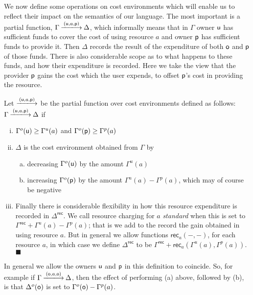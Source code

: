\documentclass{LMCS}
\newcommand{\cancom}[3]{({\ownfnt{#1}},{#2},{\ownfnt{#3}}) \xspace}
\newcommand{\record}{{\scriptstyle \mathsf{rec}}}
\newcommand{\ar}[1]{\mathbin{\xlongrightarrow{ #1}}}
\newcommand{\EndDefBox}{\null\hfill$\blacksquare$}
\newcommand{\boxHere}{\global\let\EndProof\empty\EndDefBox}
\begin{document}
We now define some operations on cost environments which will enable
us to reflect their impact on the semantics of our language. The most
important is a partial function, $\Gamma \ar{\cancom{u}{a}{p}}
\Delta$, which informally means that in $\Gamma$ owner ${\mathsf{u}}$ has
sufficient funds to cover the cost of using resource $a$ and owner
${\mathsf{p}}$ has sufficient funds to provide it.  Then $\Delta$ records
the result of the expenditure of both ${\mathsf{o}}$ and ${\mathsf{p}}$ of
those funds. There is also considerable scope as to what happens to
these funds, and how their expenditure is recorded.  Here we take the
view that the provider ${\mathsf{p}}$ gains the cost which the user
expends, to offset  ${\mathsf{p}}$'s cost in providing the resource.
\begin{defi}\label{def:rescharging}
  Let $\ar{\cancom{u}{a}{p}}$ be the partial function 
over cost environments defined as follows:
$\Gamma \ar{\cancom{u}{a}{p}} \Delta$ if
\begin{enumerate}[(i)]



\item $\Gamma^o({{\mathsf{u}}}) \geq \Gamma^u(a)$ and 
$\Gamma^o({{\mathsf{p}}}) \geq \Gamma^p(a)$

\item $\Delta$  is the cost environment obtained from $\Gamma$ by 
  \begin{enumerate}[(a)]
  \item decreasing $\Gamma^o({{\mathsf{u}}})$ by the amount  $\Gamma^u(a)$

  \item increasing  $\Gamma^o({{\mathsf{p}}})$ by the 
amount $\Gamma^u(a) - \Gamma^p(a)$, which may of course be negative


  \end{enumerate}

\item 
  Finally there is considerable flexibility in how this resource
  expenditure is recorded in $\Delta^{\record}$.  We call resource 
  charging  for $a$  \emph{standard} when this is set to $\Gamma^{\record} 
  + \Gamma^u(a) -  \Gamma^p(a)$; that is we add to the record the gain
  obtained in using resource $a$.  But in general we allow functions
  $\record_a(-,-)$, for each resource $a$, in which case we define
  $\Delta^{\record}$ to be $\Gamma^{\record} + \record_a(\Gamma^u(a),\Gamma^p(a))$. \boxHere
\end{enumerate}
\end{defi}
\noindent
In general we allow the owners ${\mathsf{u}}$ and ${\mathsf{p}}$ in this definition
to coincide. So, for example if 
$\Gamma \ar{\cancom{o}{a}{o}} \Delta$, then the effect of performing (a) above, 
followed by (b), is that 
$\Delta^o({\mathsf{o}})$ is set to  $\Gamma^o({\mathsf{o}}) - \Gamma^p( a)$.
 
\end{document}
